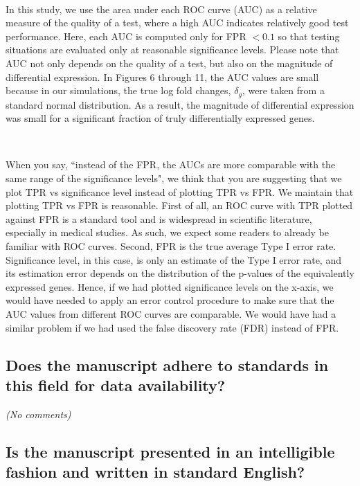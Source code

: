 \documentclass{article}
\providecommand{\q}{$\quad$ \newline}
\begin{document}
\begin{flushleft}
{\paragraph{} 
In this study, we use the area under each ROC curve (AUC) as a relative measure of the quality of a test, where a high AUC indicates relatively good test performance. Here, each AUC is computed only for FPR $< 0.1$ so that testing situations are evaluated only at reasonable significance levels. Please note that AUC not only depends on the quality of a test, but also on the magnitude of differential expression. In Figures 6 through 11, the AUC values are small because in our simulations, the true log fold changes, $\delta_g$, were taken from a standard normal distribution. As a result, the magnitude of differential expression was small for a significant fraction of truly differentially expressed genes.} \q

When you say, ``instead of the FPR, the AUCs are more comparable with the same range of the significance levels", we think that you are suggesting that we plot TPR vs significance level instead of plotting TPR vs FPR. We maintain that plotting TPR vs FPR is reasonable. First of all, an ROC curve with TPR plotted against FPR is a standard tool and is widespread in scientific literature, especially in medical studies. As such, we expect some readers to already be familiar with ROC curves. Second,  FPR is the true average Type I error rate. Significance level, in this case, is only an estimate of the Type I error rate, and its estimation error depends on the distribution of the p-values of the equivalently expressed genes. Hence, if we had plotted significance levels on the x-axis, we would have needed to apply an error control procedure to make sure that the AUC values from different ROC curves are comparable. We would have had a similar problem if we had used the false discovery rate (FDR) instead of FPR.


\subsection{Does the manuscript adhere to standards in this field for data availability?}

\emph{(No comments)}

\subsection{Is the manuscript presented in an intelligible fashion and written in standard English?}


\end{flushleft}
\end{document}
